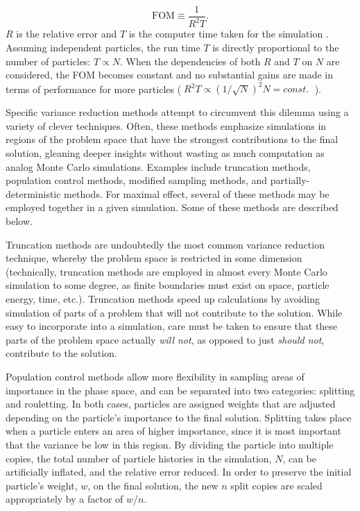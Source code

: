 \documentclass[10pt]{article}
\begin{document}
\begin{equation*}
\text{FOM} \equiv \frac{1}{R^{2}T}.
\end{equation*}
%
$R$ is the relative error and $T$ is the computer time taken for the simulation \cite{software:mcnp5}.
Assuming independent particles, the run time $T$ is directly proportional to the number of particles: $ T \propto N $.
When the dependencies of both $R$ and $T$ on $N$ are considered, the FOM becomes constant and no substantial gains are made in terms of performance for more particles ($\;R^{2}T \propto (1/\sqrt{N})^{2}N = const.\;$ ).

Specific variance reduction methods attempt to circumvent this dilemma using a variety of clever techniques.
Often, these methods emphasize simulations in regions of the problem space that have the strongest contributions to the final solution, gleaning deeper insights without wasting as much computation as analog Monte Carlo simulations.
Examples include truncation methods, population control methods, modified sampling methods, and partially-deterministic methods. For maximal effect, several of these methods may be employed together in a given simulation. Some of these methods are described below.

Truncation methods are undoubtedly the most common variance reduction technique, whereby the problem space is restricted in some dimension (technically, truncation methods are employed in almost every Monte Carlo simulation to some degree, as finite boundaries must exist on space, particle energy, time, etc.).
Truncation methods speed up calculations by avoiding simulation of parts of a problem that will not contribute to the solution.
While easy to incorporate into a simulation, care must be taken to ensure that these parts of the problem space actually \textit{will not}, as opposed to just \textit{should not}, contribute to the solution.

Population control methods allow more flexibility in sampling areas of importance in the phase space, and can be separated into two categories: splitting and rouletting.
In both cases, particles are assigned weights that are adjusted depending on the particle's importance to the final solution.
Splitting takes place when a particle enters an area of higher importance, since it is most important that the variance be low in this region.
By dividing the particle into multiple copies, the total number of particle histories in the simulation, $N$, can be artificially inflated, and the relative error reduced.
In order to preserve the initial particle's weight, $w$, on the final solution, the new $n$ split copies are scaled appropriately by a factor of $w$/$n$.
\end{document}
